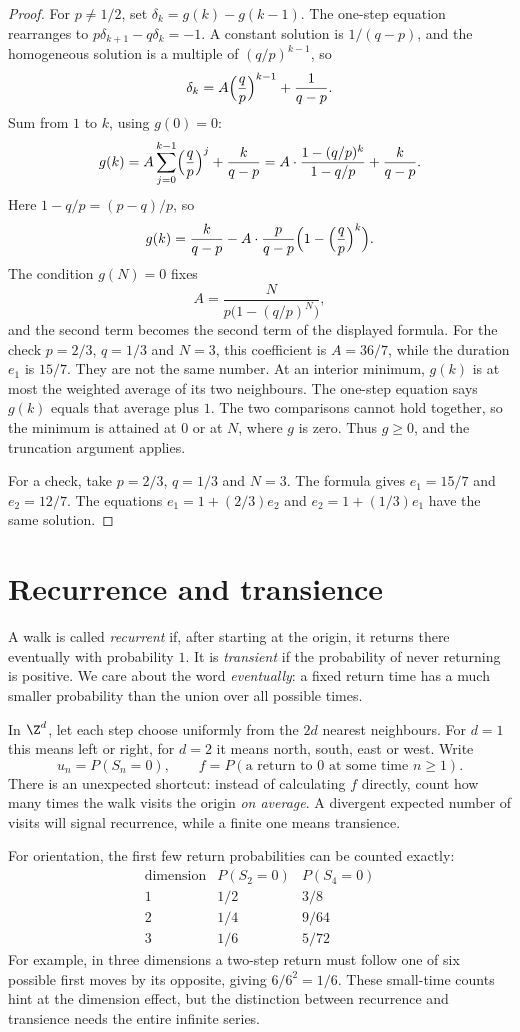 \begin{proof}
For $p\ne1/2$, set $\delta_k=g(k)-g(k-1)$. The one-step equation rearranges to $p\delta_{k+1}-q\delta_k=-1$. A constant solution is $1/(q-p)$, and the homogeneous solution is a multiple of $(q/p)^{k-1}$, so
\[
 \delta_k=A\Bigl(\frac qp\Bigr)^{k-1}+\frac1{q-p}.
\]
Sum from $1$ to $k$, using $g(0)=0$:
\[
 g(k)=A\sum_{j=0}^{k-1}\Bigl(\frac qp\Bigr)^j+\frac{k}{q-p}
 =A\cdot\frac{1-(q/p)^k}{1-q/p}+\frac{k}{q-p}.
\]
Here $1-q/p=(p-q)/p$, so
\[
 g(k)=\frac{k}{q-p}-A\cdot\frac{p}{q-p}\Bigl(1-\Bigl(\frac qp\Bigr)^k\Bigr).
\]
The condition $g(N)=0$ fixes
\[
 A=\frac{N}{p\bigl(1-(q/p)^N\bigr)},
\]
and the second term becomes the second term of the displayed formula. For the check $p=2/3$, $q=1/3$ and $N=3$, this coefficient is $A=36/7$, while the duration $e_1$ is $15/7$. They are not the same number. At an interior minimum, $g(k)$ is at most the weighted average of its two neighbours. The one-step equation says $g(k)$ equals that average plus $1$. The two comparisons cannot hold together, so the minimum is attained at $0$ or at $N$, where $g$ is zero. Thus $g\ge0$, and the truncation argument applies.

For a check, take $p=2/3$, $q=1/3$ and $N=3$. The formula gives $e_1=15/7$ and $e_2=12/7$. The equations $e_1=1+(2/3)e_2$ and $e_2=1+(1/3)e_1$ have the same solution.
\end{proof}

\section{Recurrence and transience}

A walk is called \emph{recurrent} if, after starting at the origin, it returns there eventually with probability $1$. It is \emph{transient} if the probability of never returning is positive. We care about the word \emph{eventually}: a fixed return time has a much smaller probability than the union over all possible times.

In $\Z^d$, let each step choose uniformly from the $2d$ nearest neighbours. For $d=1$ this means left or right, for $d=2$ it means north, south, east or west. Write
\[
 u_n=P(S_n=0),\qquad
 f=P(\text{a return to }0\text{ at some time }n\ge1).
\]
There is an unexpected shortcut: instead of calculating $f$ directly, count how many times the walk visits the origin \emph{on average}. A divergent expected number of visits will signal recurrence, while a finite one means transience.

For orientation, the first few return probabilities can be counted exactly:
\[
\begin{array}{c|cc}
\text{dimension}&P(S_2=0)&P(S_4=0)\\\hline
1&1/2&3/8\\
2&1/4&9/64\\
3&1/6&5/72
\end{array}
\]
For example, in three dimensions a two-step return must follow one of six possible first moves by its opposite, giving $6/6^2=1/6$. These small-time counts hint at the dimension effect, but the distinction between recurrence and transience needs the entire infinite series.

